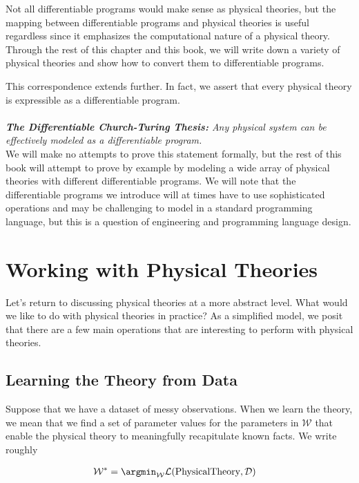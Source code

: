 \documentclass[book.tex]{subfiles}
\begin{document}
Not all differentiable programs would make sense as physical theories, but the mapping between differentiable programs and physical theories is useful regardless since it emphasizes the computational nature of a physical theory. Through the rest of this chapter and this book, we will write down a variety of physical theories and show how to convert them to differentiable programs.



This correspondence extends further. In fact, we assert that every physical theory is expressible as a differentiable program. 
\\ \\
\textit{\textbf{The Differentiable Church-Turing Thesis:} Any physical system can be effectively modeled as a differentiable program.}
\\

We will make no attempts to prove this statement formally, but the rest of this book will attempt to prove by example by modeling a wide array of physical theories with different differentiable programs. We will note that the differentiable programs we introduce will at times have to use sophisticated operations and may be challenging to model in a standard programming language, but this is a question of engineering and programming language design.



\section{Working with Physical Theories}

Let's return to discussing physical theories at a more abstract level. What would we like to do with physical theories in practice? As a simplified model, we posit that there are a few main operations that are interesting to perform with physical theories.

\subsection{Learning the Theory from Data}

Suppose that we have a dataset of messy observations. When we learn the theory, we mean that we find a set of parameter values for the parameters in $\mathcal{W}$ that enable the physical theory to meaningfully recapitulate known facts. We write roughly

\begin{align}
\mathcal{W}^* &= \argmin_{\mathcal{W}} \mathcal{L}(\textrm{PhysicalTheory}, \mathcal{D})
\end{align}
\end{document}
